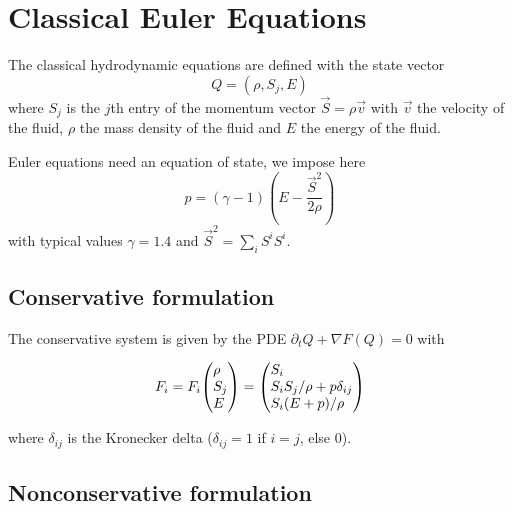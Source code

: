 \documentclass[a4paper]{article}
\newenvironment{pvector}{\begin{pmatrix*}[l]}{\end{pmatrix*}}
\begin{document}
\section{Classical Euler Equations}

The classical hydrodynamic equations are defined with the state vector
\begin{equation}
Q = (\rho, S_j, E)
\end{equation}
where $S_j$ is the $j$th entry of the momentum vector $\vec S = \rho \vec v$ with $\vec v$ the velocity of the fluid, $\rho$ the mass density of the fluid and $E$ the energy of the fluid.

Euler equations need an equation of state, we impose here
\begin{equation}
p = (\gamma-1) \left( E - \frac { \vec S^2 }{2 \rho} \right)
\end{equation}
with typical values $\gamma=1.4$ and $\vec S^2 = \sum_i S^i S^i$.

\subsection{Conservative formulation}

The conservative system is given by the PDE $\partial_t Q + \nabla F(Q) = 0$ with

\begin{equation}\label{fluxes}
F_i = F_i\begin{pvector} \rho \\ S_j \\ E \end{pvector}
=
\begin{pvector}
S_i \\
S_i S_j / \rho + p \delta_{ij} \\
S_i (E + p) / \rho
\end{pvector}
\end{equation}

where $\delta_{ij}$ is the Kronecker delta ($\delta_{ij}=1$ if $i=j$, else 0).

\subsection{Nonconservative formulation}
\end{document}
